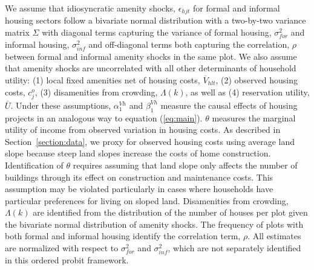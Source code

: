 \documentclass[12pt]{article}
\begin{document}
We assume that idiosyncratic amenity shocks, $\epsilon_{hjt}$ for formal and informal housing sectors follow a bivariate normal distribution with a two-by-two variance matrix $\Sigma$ with diagonal terms capturing the variance of formal housing, $\sigma_{for}^{2}$ and informal housing, $\sigma_{inf}^{2}$ and off-diagonal terms both capturing the correlation, $\rho$ between formal and informal amenity shocks in the same plot.  We also assume that amenity shocks are uncorrelated with all other determinants of household utility: (1) local fixed amenities net of housing costs, $\overline{V}_{hlt}$, (2) observed housing costs, $c^{o}_{j}$, (3) disamenities from crowding, $\Lambda(k)$, as well as (4) reservation utility, $\overline{U}$.   Under these assumptions, $\alpha^{Vh}_1$ and $\beta^{Vh}_1$ measure the causal effects of housing projects in an analogous way to equation (\ref{eq:main}).  $\theta$ measures the marginal utility of income from observed variation in housing costs.  As described in Section~\ref{section:data}, we proxy for observed housing costs using average land slope because steep land slopes increase the costs of home construction.  Identification of $\theta$ requires assuming that land slope only affects the number of buildings through its effect on construction and maintenance costs.  This assumption may be violated particularly in cases where households have particular preferences for living on sloped land.  Disamenities from crowding, $\Lambda(k)$ are identified from the distribution of the number of houses per plot given the bivariate normal distribution of amenity shocks.  The frequency of plots with both formal and informal housing identify the correlation term, $\rho$.  All estimates are normalized with respect to $\sigma_{for}^{2}$ and $\sigma_{inf}^{2}$, which are not separately identified in this ordered probit framework.
\end{document}
